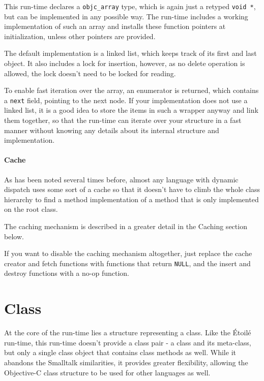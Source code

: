 This run-time declares a \verb=objc_array= type, which is again just a retyped \verb=void *=, but can be implemented in any possible way. The run-time includes a working implementation of such an array and installs these function pointers at initialization, unless other pointers are provided.

The default implementation is a linked list, which keeps track of its first and last object. It also includes a lock for insertion, however, as no delete operation is allowed, the lock doesn't need to be locked for reading.

To enable fast iteration over the array, an enumerator is returned, which contains a \verb=next= field, pointing to the next node. If your implementation does not use a linked list, it is a good idea to store the items in such a wrapper anyway and link them together, so that the run-time can iterate over your structure in a fast manner without knowing any details about its internal structure and implementation.

\paragraph{Cache}

As has been noted several times before, almost any language with dynamic dispatch uses some sort of a cache so that it doesn't have to climb the whole class hierarchy to find a method implementation of a method that is only implemented on the root class.

The caching mechanism is described in a greater detail in the Caching section below. 

If you want to disable the caching mechanism altogether, just replace the cache creator and fetch functions with functions that return \verb=NULL=, and the insert and destroy functions with a no-op function.

\section{Class}

At the core of the run-time lies a structure representing a class. Like the \'Etoil\'e run-time, this run-time doesn't provide a class pair - a class and its meta-class, but only a single class object that contains class methods as well. While it abandons the Smalltalk similarities, it provides greater flexibility, allowing the Objective-C class structure to be used for other languages as well.


